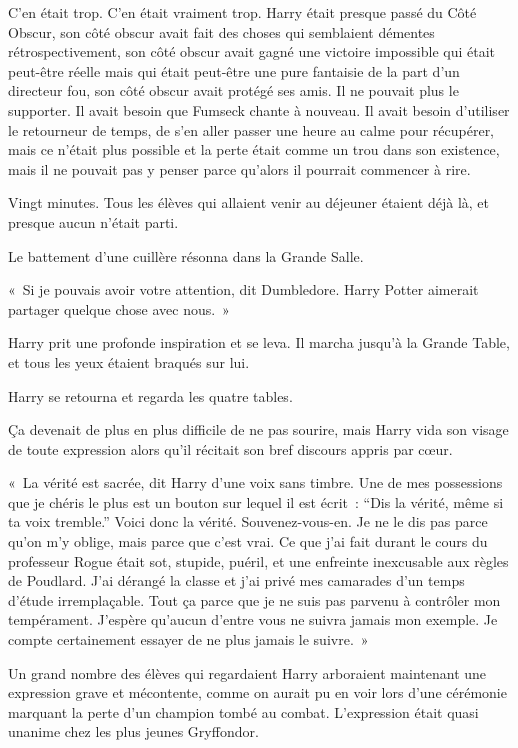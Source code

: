 C'en était trop.
C'en était vraiment trop.
Harry était presque passé du Côté Obscur, son côté obscur avait fait des choses qui semblaient démentes rétrospectivement, son côté obscur avait gagné une victoire impossible qui était peut-être réelle mais qui était peut-être une pure fantaisie de la part d'un directeur fou, son côté obscur avait protégé ses amis.
Il ne pouvait plus le supporter.
Il avait besoin que Fumseck chante à nouveau.
Il avait besoin d'utiliser le retourneur de temps, de s'en aller passer une heure au calme pour récupérer, mais ce n'était plus possible et la perte était comme un trou dans son existence, mais il ne pouvait pas y penser parce qu'alors il pourrait commencer à rire.

Vingt minutes.
Tous les élèves qui allaient venir au déjeuner étaient déjà là, et presque aucun n'était parti.

Le battement d'une cuillère résonna dans la Grande Salle.

«~Si je pouvais avoir votre attention, dit Dumbledore.
Harry Potter aimerait partager quelque chose avec nous.~»

Harry prit une profonde inspiration et se leva.
Il marcha jusqu'à la Grande Table, et tous les yeux étaient braqués sur lui.

Harry se retourna et regarda les quatre tables.

Ça devenait de plus en plus difficile de ne pas sourire, mais Harry vida son visage de toute expression alors qu'il récitait son bref discours appris par cœur.

«~La vérité est sacrée, dit Harry d'une voix sans timbre.
Une de mes possessions que je chéris le plus est un bouton sur lequel il est écrit~: “Dis la vérité, même si ta voix tremble.” Voici donc la vérité.
Souvenez-vous-en.
Je ne le dis pas parce qu'on m'y oblige, mais parce que c'est vrai.
Ce que j'ai fait durant le cours du professeur Rogue était sot, stupide, puéril, et une enfreinte inexcusable aux règles de Poudlard.
J'ai dérangé la classe et j'ai privé mes camarades d'un temps d'étude irremplaçable.
Tout ça parce que je ne suis pas parvenu à contrôler mon tempérament.
J'espère qu'aucun d'entre vous ne suivra jamais mon exemple.
Je compte certainement essayer de ne plus jamais le suivre.~»

Un grand nombre des élèves qui regardaient Harry arboraient maintenant une expression grave et mécontente, comme on aurait pu en voir lors d'une cérémonie marquant la perte d'un champion tombé au combat.
L'expression était quasi unanime chez les plus jeunes Gryffondor.

